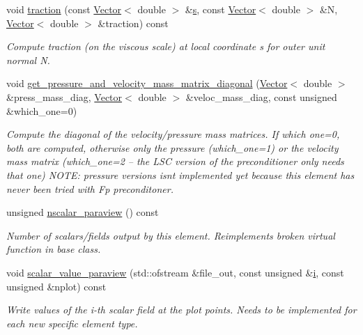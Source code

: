 \begin{DoxyCompactItemize}
void \hyperlink{classoomph_1_1AxisymmetricNavierStokesEquations_a0a5523b91d5191c2f9e23fe8d74f4e07}{traction} (const \hyperlink{classoomph_1_1Vector}{Vector}$<$ double $>$ \&\hyperlink{cfortran_8h_ab7123126e4885ef647dd9c6e3807a21c}{s}, const \hyperlink{classoomph_1_1Vector}{Vector}$<$ double $>$ \&N, \hyperlink{classoomph_1_1Vector}{Vector}$<$ double $>$ \&traction) const
\begin{DoxyCompactList}\small\item\em Compute traction (on the viscous scale) at local coordinate s for outer unit normal N. \end{DoxyCompactList}\item 
void \hyperlink{classoomph_1_1AxisymmetricNavierStokesEquations_ac0c850c7a41b408784f3a103f9aba982}{get\+\_\+pressure\+\_\+and\+\_\+velocity\+\_\+mass\+\_\+matrix\+\_\+diagonal} (\hyperlink{classoomph_1_1Vector}{Vector}$<$ double $>$ \&press\+\_\+mass\+\_\+diag, \hyperlink{classoomph_1_1Vector}{Vector}$<$ double $>$ \&veloc\+\_\+mass\+\_\+diag, const unsigned \&which\+\_\+one=0)
\begin{DoxyCompactList}\small\item\em Compute the diagonal of the velocity/pressure mass matrices. If which one=0, both are computed, otherwise only the pressure (which\+\_\+one=1) or the velocity mass matrix (which\+\_\+one=2 -- the L\+SC version of the preconditioner only needs that one) N\+O\+TE\+: pressure versions isn\textquotesingle{}t implemented yet because this element has never been tried with Fp preconditoner. \end{DoxyCompactList}\item 
unsigned \hyperlink{classoomph_1_1AxisymmetricNavierStokesEquations_a1383f2cbddcd5a9b69ed41aab82dca36}{nscalar\+\_\+paraview} () const
\begin{DoxyCompactList}\small\item\em Number of scalars/fields output by this element. Reimplements broken virtual function in base class. \end{DoxyCompactList}\item 
void \hyperlink{classoomph_1_1AxisymmetricNavierStokesEquations_a2971656a8fa501ac3e4710c3f1c44275}{scalar\+\_\+value\+\_\+paraview} (std\+::ofstream \&file\+\_\+out, const unsigned \&\hyperlink{cfortran_8h_adb50e893b86b3e55e751a42eab3cba82}{i}, const unsigned \&nplot) const
\begin{DoxyCompactList}\small\item\em Write values of the i-\/th scalar field at the plot points. Needs to be implemented for each new specific element type. \end{DoxyCompactList}\item 

\end{DoxyCompactItemize}
